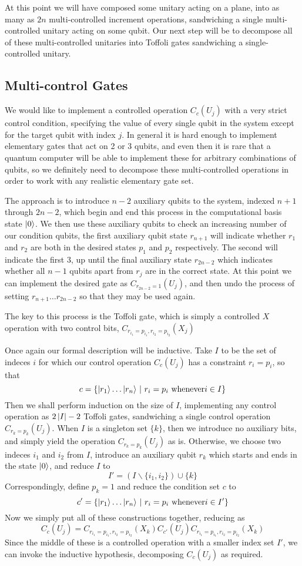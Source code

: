 At this point we will have composed some unitary acting on a plane, into as many as $2n$ multi-controlled increment operations, sandwiching a single multi-controlled unitary acting on some qubit. Our next step will be to decompose all of these multi-controlled unitaries into Toffoli gates sandwiching a single-controlled unitary.

\subsection{Multi-control Gates}
We would like to implement a controlled operation $C_c(U_j)$ with a very strict control condition, specifying the value of every single qubit in the system except for the target qubit with index $j$. In general it is hard enough to implement elementary gates that act on 2 or 3 qubits, and even then it is rare that a quantum computer will be able to implement these for arbitrary combinations of qubits, so we definitely need to decompose these multi-controlled operations in order to work with any realistic elementary gate set.

The approach is to introduce $n-2$ auxiliary qubits to the system, indexed $n+1$ through $2n-2$, which begin and end this process in the computational basis state $| 0 \rangle$. We then use these auxiliary qubits to check an increasing number of our condition qubits, the first auxiliary qubit state $r_{n+1}$ will indicate whether $r_1$ and $r_2$ are both in the desired states $p_1$ and $p_2$ respectively. The second will indicate the first 3, up until the final auxiliary state $r_{2n-2}$ which indicates whether all $n-1$ qubits apart from $r_j$ are in the correct state. At this point we can implement the desired gate as $C_{r_{2n-2}=1}(U_j)$, and then undo the process of setting $r_{n+1} \dots r_{2n-2}$ so that they may be used again.

The key to this process is the Toffoli gate, which is simply a controlled $X$ operation with two control bits, $C_{r_{i_1}=p_{i_1},r_{i_2}=p_{i_2}}(X_j)$

Once again our formal description will be inductive. Take $I$ to be the set of indeces $i$ for which our control operation $C_c(U_j)$ has a constraint $r_i = p_i$, so that
\[c = \{\ket{r_1}\dots\ket{r_n}\ |\ r_i = p_i \text{\ whenever} i \in I\}\]
Then we shall perform induction on the size of $I$, implementing any control operation as $2\left| I \right|-2$ Toffoli gates, sandwiching a single control operation $C_{r_k=p_k}(U_j)$. When $I$ is a singleton set $\{k\}$, then we introduce no auxiliary bits, and simply yield the operation $C_{r_k=p_k}(U_j)$ as is. Otherwise, we choose two indeces $i_1$ and $i_2$ from $I$, introduce an auxiliary qubit $r_k$ which starts and ends in the state $| 0 \rangle$, and reduce $I$ to
\[I' = (I \backslash \{i_1, i_2\})\cup \{k\}\]
Correspondingly, define $p_k = 1$ and reduce the condition set $c$ to
\[c' = \{| r_1 \rangle\dots| r_n \rangle\ |\ r_i = p_i \text{\ whenever} i \in I'\}\]
Now we simply put all of these constructions together, reducing as
\[C_c(U_j) = C_{r_{i_1}=p_{i_1},r_{i_2}=p_{i_2}}(X_k)
C_{c'}(U_j)
C_{r_{i_1}=p_{i_1},r_{i_2}=p_{i_2}}(X_k)\]
Since the middle of these is a controlled operation with a smaller index set $I'$, we can invoke the inductive hypothesis, decomposing $C_c(U_j)$ as required.

